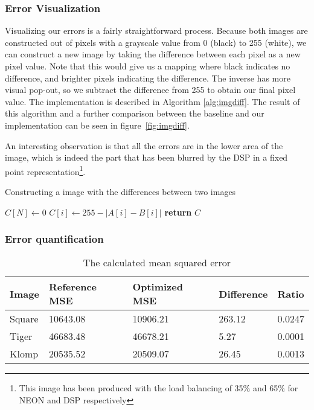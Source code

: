 \subsubsection{Error Visualization}
Visualizing our errors is a fairly straightforward process. Because both images are constructed out of pixels with a grayscale value from 0 (black) to 255 (white), we can construct a new image by taking the difference between each pixel as a new pixel value. Note that this would give us a mapping where black indicates no difference, and brighter pixels indicating the difference. The inverse has more visual pop-out, so we subtract the difference from 255 to obtain our final pixel value. The implementation is described in Algorithm \ref{alg:imgdiff}. The result of this algorithm and a further comparison between the baseline and our implementation can be seen in figure~\ref{fig:imgdiff}.

An interesting observation is that all the errors are in the lower area of the image, which is indeed the part that has been blurred by the DSP in a fixed point representation\footnote{This image has been produced with the load balancing of 35\% and 65\% for NEON and DSP respectively}.

\begin{algorithm}[t]
    \caption{Constructing a image with the differences between two images}\label{alg:imgdiff}
    \begin{algorithmic}[1]
        \State $C[N]\gets 0$
           \State $C[i]\gets 255 - |A[i] - B[i]|$
        \EndFor
        \State \textbf{return} $C$
        \EndProcedure
    \end{algorithmic}
\end{algorithm}

\subsubsection{Error quantification}



\begin{table}
    \centering
    \begin{tabular}{l | l l l l}
    Image   & Reference MSE & Optimized MSE & Difference    & Ratio     \\
    \hline
    Square  & 10643.08      & 10906.21      & 263.12        & 0.0247    \\
    Tiger   & 46683.48      & 46678.21      &   5.27        & 0.0001    \\
    Klomp   & 20535.52      & 20509.07      &  26.45        & 0.0013
    \end{tabular}
    \caption{The calculated mean squared error}
    \label{tab:mse}
\end{table}

